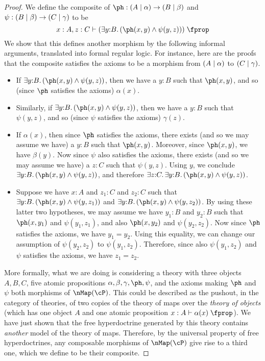 \begin{wip}
\begin{proof}
  We define the composite of $\ph:(A\cb\alpha)\to (B\cb\beta)$ and $\psi:(B\mid\beta) \to (C\mid \gamma)$ to be
  \[ x:A,z:C \types (\exists y:B. (\ph(x,y) \meet \psi(y,z))) \prop \]
  We show that this defines another morphism by the following informal arguments, translated into formal regular logic.
  For instance, here are the proofs that the composite satisfies the axioms to be a morphism from $(A\mid \alpha)$ to $(C\mid\gamma)$.
  \begin{itemize}
  \item If $\exists y:B. (\ph(x,y) \meet \psi(y,z))$, then we have a $y:B$ such that $\ph(x,y)$, and so (since $\ph$ satisfies the axioms) $\alpha(x)$.
  \item Similarly, if $\exists y:B. (\ph(x,y) \meet \psi(y,z))$, then we have a $y:B$ such that $\psi(y,z)$, and so (since $\psi$ satisfies the axioms) $\gamma(z)$.
  \item If $\alpha(x)$, then since $\ph$ satisfies the axioms, there exists (and so we may assume we have) a $y:B$ such that $\ph(x,y)$.
    Moreover, since $\ph(x,y)$, we have $\beta(y)$.
    Now since $\psi$ also satisfies the axioms, there exists (and so we may assume we have) a $z:C$ such that $\psi(y,z)$.
    Using $y$, we conclude $\exists y:B.(\ph(x,y) \meet \psi(y,z))$, and therefore $\exists z:C.\exists y:B.(\ph(x,y) \meet \psi(y,z))$.
  \item Suppose we have $x:A$ and $z_1:C$ and $z_2:C$ such that $\exists y:B.(\ph(x,y) \meet \psi(y,z_1))$ and $\exists y:B.(\ph(x,y) \meet \psi(y,z_2))$.
    By using these latter two hypotheses, we may assume we have $y_1:B$ and $y_2:B$ such that $\ph(x,y_1)$ and $\psi(y_1,z_1)$, and also $\ph(x,y_2)$ and $\psi(y_2,z_2)$.
    Now since $\ph$ satisfies the axioms, we have $y_1=y_2$.
    Using this equality, we can change our assumption of $\psi(y_2,z_2)$ to $\psi(y_1,z_2)$.
    Therefore, since also $\psi(y_1,z_2)$ and $\psi$ satisfies the axioms, we have $z_1=z_2$.
  \end{itemize}
  More formally, what we are doing is considering a theory with three objects $A,B,C$, five atomic propositions $\alpha,\beta,\gamma,\ph,\psi$, and the axioms making $\ph$ and $\psi$ both morphisms of $\nMap(\cP)$.
  This could be described as the pushout, in the category of theories, of two copies of the theory of maps over the \emph{theory of objects} (which has one object $A$ and one atomic proposition $x:A \types \alpha(x)\prop$).
  We have just shown that the free hyperdoctrine generated by this theory contains \emph{another} model of the theory of maps.
  Therefore, by the universal property of free hyperdoctrines, any composable morphisms of $\nMap(\cP)$ give rise to a third one, which we define to be their composite.


\end{proof}
\end{wip}
